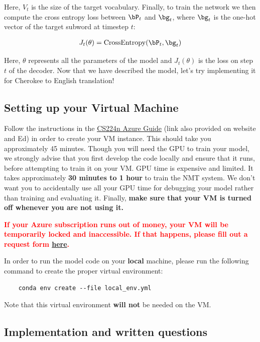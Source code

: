 Here, $V_{t}$ is the size of the target vocabulary. Finally, to train the network we then compute the cross entropy loss between $\bP_t$ and $\bg_{t}$, where $\bg_{t}$ is the one-hot vector of the target subword at timestep $t$:

\begin{align}
    J_t(\theta) = \mathrm{CrossEntropy}(\bP_t,\bg_{t})
\end{align}

Here, $\theta$ represents all the parameters of the model and $J_t(\theta)$ is the loss on step $t$ of the decoder.
Now that we have described the model, let's try implementing it for Cherokee to English translation!

\subsection*{Setting up your Virtual Machine}
Follow the instructions in the \href{https://docs.google.com/document/d/10rhknu-xJJCHUQx3DPqKuHT35EqftmZ1rEdR1nJoBFo/edit#heading=h.4tqnggp12z76}{CS224n Azure Guide} (link also provided on website and Ed) in order to create your VM instance. This should take you approximately 45 minutes. Though you will need the GPU to train your model, we strongly advise that you first develop the code locally and ensure that it runs, before attempting to train it on your VM. GPU time is expensive and limited. It takes approximately \textbf{30 minutes to 1 hour} to train the NMT system. We don't want you to accidentally use all your GPU time for debugging your model rather than training and evaluating it. Finally, \textbf{make sure that your VM is turned off whenever you are not using it.}

\textbf{\textcolor{red}{If your Azure subscription runs out of money, your VM will be temporarily locked and inaccessible. If that happens, please fill out a request form \href{https://forms.gle/foFi9p5sQW4wNUTq6}{here}.}}

In order to run the model code on your \textbf{local} machine, please run the following command to create the proper virtual environment:

\begin{lstlisting}
    conda env create --file local_env.yml
\end{lstlisting}

Note that this virtual environment \textbf{will not} be needed on the VM.\newline

\subsection*{Implementation and written questions}

